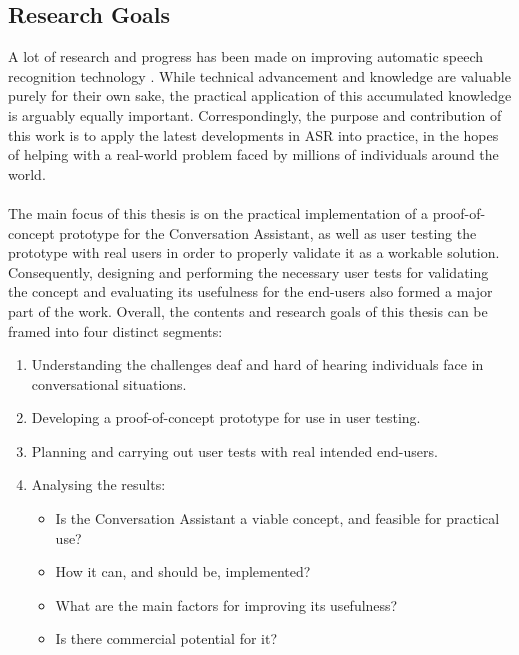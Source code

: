 \documentclass[english, 12pt, a4paper, pdftex, elec, utf8]{aaltothesis}
\begin{document}
\subsection{Research Goals}

A lot of research and progress has been made on improving automatic speech recognition technology \cite{yu2014automatic, gales2008application, keronen2014approaching, hinton2012deep, pylkkonen2013towards, xiong2016achieving, enarvi2017automatic}. While technical advancement and knowledge are valuable purely for their own sake, the practical application of this accumulated knowledge is arguably equally important. Correspondingly, the purpose and contribution of this work is to apply the latest developments in ASR into practice, in the hopes of helping with a real-world problem faced by millions of individuals around the world. \\\\
The main focus of this thesis is on the practical implementation of a proof-of-concept prototype for the Conversation Assistant, as well as user testing the prototype with real users in order to properly validate it as a workable solution. Consequently, designing and performing the necessary user tests for validating the concept and evaluating its usefulness for the end-users also formed a major part of the work. Overall, the contents and research goals of this thesis can be framed into four distinct segments: \\
\begin{enumerate}[itemsep=2.2mm]
	\item Understanding the challenges deaf and hard of hearing individuals face in conversational situations.
	\item Developing a proof-of-concept prototype for use in user testing.
	\item Planning and carrying out user tests with real intended end-users.
	\item Analysing the results:
	\begin{itemize}[align=left,  leftmargin=0.52cm, labelsep=-0.18cm, itemsep=2.2mm]
		\item Is the Conversation Assistant a viable concept, and feasible for practical use?
		\item How it can, and should be, implemented?
		\item What are the main factors for improving its usefulness? 
		\item Is there commercial potential for it? \\
	\end{itemize}
\end{enumerate}
\end{document}
